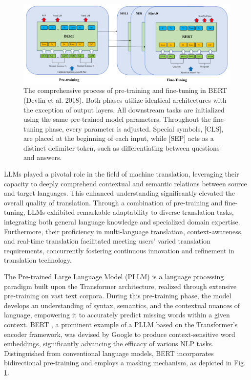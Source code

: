 \documentclass[acmsmall]{acmart}
\begin{document}
\begin{figure}[htbp]
\centering
\includegraphics[width=1.0\textwidth]{Bert.pdf}
\caption{The comprehensive process of pre-training and fine-tuning in BERT (Devlin et al. 2018). Both phases utilize identical architectures with the exception of output layers. All downstream tasks are initialized using the same pre-trained model parameters. Throughout the fine-tuning phase, every parameter is adjusted. Special symbols, [CLS], are placed at the beginning of each input, while [SEP] acts as a distinct delimiter token, such as differentiating between questions and answers.}
\label{fig:two} 
\end{figure}

LLMs played a pivotal role in the field of machine translation, leveraging their capacity to deeply comprehend contextual and semantic relations between source and target languages. This enhanced understanding significantly elevated the overall quality of translation. Through a combination of pre-training and fine-tuning, LLMs exhibited remarkable adaptability to diverse translation tasks, integrating both general language knowledge and specialized domain expertise. Furthermore, their proficiency in multi-language translation, context-awareness, and real-time translation facilitated meeting users' varied translation requirements, concurrently fostering continuous innovation and refinement in translation technology.

\color{red}


The Pre-trained Large Language Model (PLLM) is a language processing paradigm built upon the Transformer architecture, realized through extensive pre-training on vast text corpora. During this pre-training phase, the model develops an understanding of syntax, semantics, and the contextual nuances of language, empowering it to accurately predict missing words within a given context. BERT \cite{Jacob}, a prominent example of a PLLM based on the Transformer's encoder framework, was devised by Google to produce context-sensitive word embeddings, significantly advancing the efficacy of various NLP tasks. Distinguished from conventional language models, BERT incorporates bidirectional pre-training and employs a masking mechanism, as depicted in Fig. \ref{fig:two}.
\end{document}
